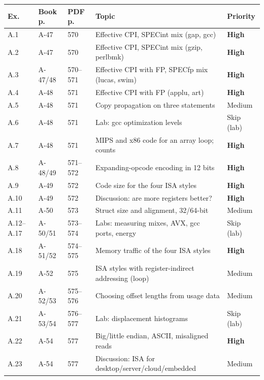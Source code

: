 \documentclass[11pt]{article}
\begin{document}
\begin{center}
\small
\renewcommand{\arraystretch}{1.15}
\begin{tabular}{@{}lll>{\raggedright\arraybackslash}p{5.2cm}l@{}}
\toprule
Ex. & Book p. & PDF p. & Topic & Priority \\
\midrule
A.1 & A-47 & 570 & Effective CPI, SPECint mix (gap, gcc) & \textbf{High} \\
A.2 & A-47 & 570 & Effective CPI, SPECint mix (gzip, perlbmk) & \textbf{High} \\
A.3 & A-47/48 & 570--571 & Effective CPI with FP, SPECfp mix (lucas, swim) & \textbf{High} \\
A.4 & A-48 & 571 & Effective CPI with FP (applu, art) & \textbf{High} \\
A.5 & A-48 & 571 & Copy propagation on three statements & Medium \\
A.6 & A-48 & 571 & Lab: gcc optimization levels & Skip (lab) \\
A.7 & A-48 & 571 & MIPS and x86 code for an array loop; counts & \textbf{High} \\
A.8 & A-48/49 & 571--572 & Expanding-opcode encoding in 12 bits & \textbf{High} \\
A.9 & A-49 & 572 & Code size for the four ISA styles & \textbf{High} \\
A.10 & A-49 & 572 & Discussion: are more registers better? & \textbf{High} \\
A.11 & A-50 & 573 & Struct size and alignment, 32/64-bit & Medium \\
A.12--A.17 & A-50/51 & 573--574 & Labs: measuring mixes, AVX, gcc ports, energy & Skip (lab) \\
A.18 & A-51/52 & 574--575 & Memory traffic of the four ISA styles & \textbf{High} \\
A.19 & A-52 & 575 & ISA styles with register-indirect addressing (loop) & Medium \\
A.20 & A-52/53 & 575--576 & Choosing offset lengths from usage data & Medium \\
A.21 & A-53/54 & 576--577 & Lab: displacement histograms & Skip (lab) \\
A.22 & A-54 & 577 & Big/little endian, ASCII, misaligned reads & \textbf{High} \\
A.23 & A-54 & 577 & Discussion: ISA for desktop/server/cloud/embedded & Medium \\
\bottomrule
\end{tabular}
\end{center}
\end{document}
